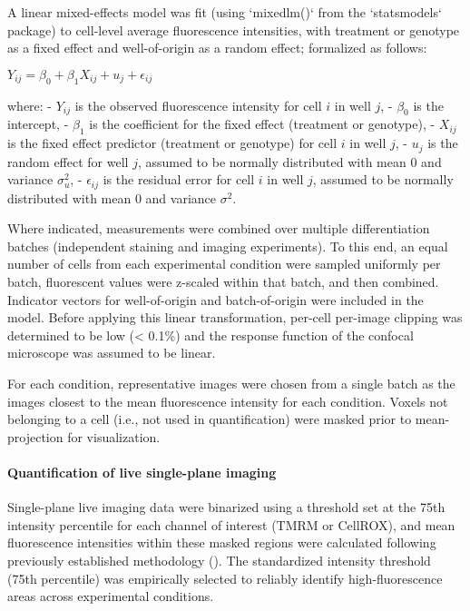 A linear mixed-effects model was fit (using `mixedlm()` from the `statsmodels` package) to cell-level average fluorescence intensities, with treatment or genotype as a fixed effect and well-of-origin as a random effect; formalized as follows:

$ Y_{ij} = \beta_0 + \beta_1 X_{ij} + u_j + \epsilon_{ij} $

where:
- $Y_{ij}$ is the observed fluorescence intensity for cell $i$ in well $j$,
- $\beta_0$ is the intercept,
- $\beta_1$ is the coefficient for the fixed effect (treatment or genotype),
- $X_{ij}$ is the fixed effect predictor (treatment or genotype) for cell $i$ in well $j$,
- $u_j$ is the random effect for well $j$, assumed to be normally distributed with mean 0 and variance $\sigma_u^2$,
- $\epsilon_{ij}$ is the residual error for cell $i$ in well $j$, assumed to be normally distributed with mean 0 and variance $\sigma^2$.

Where indicated, measurements were combined over multiple differentiation batches (independent staining and imaging experiments). To this end, an equal number of cells from each experimental condition were sampled uniformly per batch, fluorescent values were z-scaled within that batch, and then combined. Indicator vectors for well-of-origin and batch-of-origin were included in the model. Before applying this linear transformation, per-cell per-image clipping was determined to be low (< 0.1\%) and the response function of the confocal microscope was assumed to be linear.

For each condition, representative images were chosen from a single batch as the images closest to the mean fluorescence intensity for each condition. Voxels not belonging to a cell (i.e., not used in quantification) were masked prior to mean-projection for visualization.

\paragraph{Quantification of live single-plane imaging}
Single-plane live imaging data were binarized using a threshold set at the 75th intensity percentile for each channel of interest (TMRM or CellROX), and mean fluorescence intensities within these masked regions were calculated following previously established methodology (\cite{Esteras2020-md}). The standardized intensity threshold (75th percentile) was empirically selected to reliably identify high-fluorescence areas across experimental conditions.